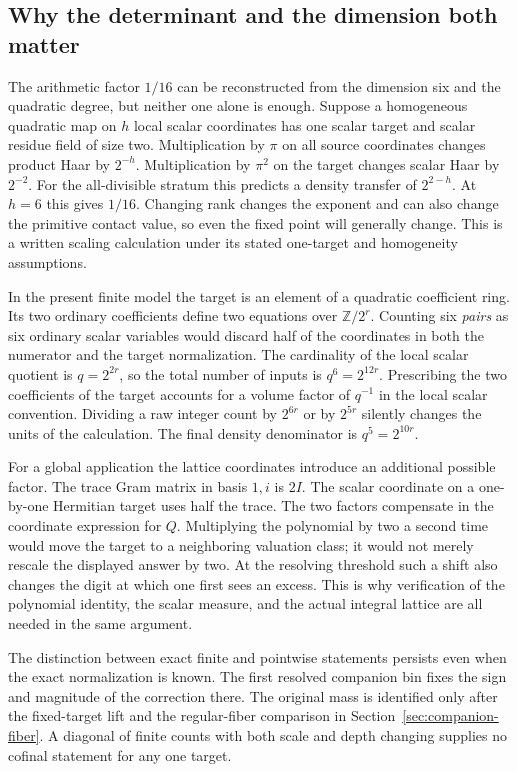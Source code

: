 \documentclass[12pt,letterpaper]{article}
\begin{document}
\subsection{Why the determinant and the dimension both matter}
The arithmetic factor $1/16$ can be reconstructed from the dimension six and the quadratic degree, but neither one alone is enough. Suppose a homogeneous quadratic map on $h$ local scalar coordinates has one scalar target and scalar residue field of size two. Multiplication by $\pi$ on all source coordinates changes product Haar by $2^{-h}$. Multiplication by $\pi^2$ on the target changes scalar Haar by $2^{-2}$. For the all-divisible stratum this predicts a density transfer of $2^{2-h}$. At $h=6$ this gives $1/16$. Changing rank changes the exponent and can also change the primitive contact value, so even the fixed point will generally change. This is a written scaling calculation under its stated one-target and homogeneity assumptions.

In the present finite model the target is an element of a quadratic coefficient ring. Its two ordinary coefficients define two equations over $\mathbb Z/2^r$. Counting six \emph{pairs} as six ordinary scalar variables would discard half of the coordinates in both the numerator and the target normalization. The cardinality of the local scalar quotient is $q=2^{2r}$, so the total number of inputs is $q^6=2^{12r}$. Prescribing the two coefficients of the target accounts for a volume factor of $q^{-1}$ in the local scalar convention. Dividing a raw integer count by $2^{6r}$ or by $2^{5r}$ silently changes the units of the calculation. The final density denominator is $q^5=2^{10r}$.

For a global application the lattice coordinates introduce an additional possible factor. The trace Gram matrix in basis $1,i$ is $2I$. The scalar coordinate on a one-by-one Hermitian target uses half the trace. The two factors compensate in the coordinate expression for $Q$. Multiplying the polynomial by two a second time would move the target to a neighboring valuation class; it would not merely rescale the displayed answer by two. At the resolving threshold such a shift also changes the digit at which one first sees an excess. This is why verification of the polynomial identity, the scalar measure, and the actual integral lattice are all needed in the same argument.

The distinction between exact finite and pointwise statements persists even when the exact normalization is known. The first resolved companion bin fixes the sign and magnitude of the correction there. The original mass is identified only after the fixed-target lift and the regular-fiber comparison in Section~\ref{sec:companion-fiber}. A diagonal of finite counts with both scale and depth changing supplies no cofinal statement for any one target.
\end{document}
